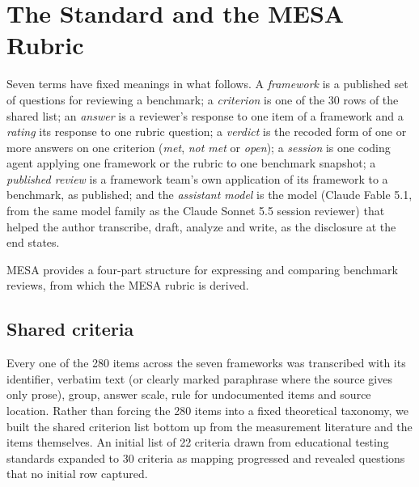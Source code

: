 \documentclass[10pt,conference]{IEEEtran}
\begin{document}
\section{The Standard and the MESA Rubric}
Seven terms have fixed meanings in what follows. A \emph{framework} is a published set of questions for reviewing a benchmark; a \emph{criterion} is one of the 30 rows of the shared list; an \emph{answer} is a reviewer's response to one item of a framework and a \emph{rating} its response to one rubric question; a \emph{verdict} is the recoded form of one or more answers on one criterion (\emph{met}, \emph{not met} or \emph{open}); a \emph{session} is one coding agent applying one framework or the rubric to one benchmark snapshot; a \emph{published review} is a framework team's own application of its framework to a benchmark, as published; and the \emph{assistant model} is the model (Claude Fable 5.1, from the same model family as the Claude Sonnet 5.5 session reviewer) that helped the author transcribe, draft, analyze and write, as the disclosure at the end states.

MESA provides a four-part structure for expressing and comparing benchmark reviews, from which the MESA rubric is derived.

\subsection{Shared criteria}
Every one of the 280 items across the seven frameworks was transcribed with its identifier, verbatim text (or clearly marked paraphrase where the source gives only prose), group, answer scale, rule for undocumented items and source location. Rather than forcing the 280 items into a fixed theoretical taxonomy, we built the shared criterion list bottom up from the measurement literature and the items themselves. An initial list of 22 criteria drawn from educational testing standards \cite{aera_apa_ncme_standards_2014,kane_validation,efpa_test_review_model_2025} expanded to 30 criteria as mapping progressed and revealed questions that no initial row captured.
\end{document}

